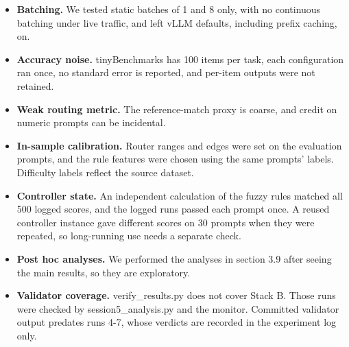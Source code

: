 \begin{itemize}
\item \textbf{Batching.} We tested static batches of 1 and 8 only, with no continuous batching under live traffic, and left vLLM defaults, including prefix caching, on.
\item \textbf{Accuracy noise.} tinyBenchmarks has 100 items per task, each configuration ran once, no standard error is reported, and per-item outputs were not retained.
\item \textbf{Weak routing metric.} The reference-match proxy is coarse, and credit on numeric prompts can be incidental.
\item \textbf{In-sample calibration.} Router ranges and edges were set on the evaluation prompts, and the rule features were chosen using the same prompts' labels. Difficulty labels reflect the source dataset.
\item \textbf{Controller state.} An independent calculation of the fuzzy rules matched all 500 logged scores, and the logged runs passed each prompt once. A reused controller instance gave different scores on 30 prompts when they were repeated, so long-running use needs a separate check.
\item \textbf{Post hoc analyses.} We performed the analyses in section 3.9 after seeing the main results, so they are exploratory.
\item \textbf{Validator coverage.} verify\_\allowbreak{}results.py does not cover Stack B. Those runs were checked by session5\_\allowbreak{}analysis.py and the monitor. Committed validator output predates runs 4-7, whose verdicts are recorded in the experiment log only.
\end{itemize}
